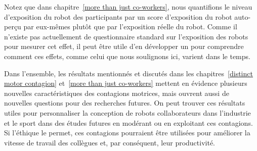 
Notez que dans chapitre~\ref{more than just co-workers}, nous quantifions le niveau d'exposition du robot des participants par un score d'exposition du robot auto-perçu par eux-mêmes plutôt que par l'exposition réelle du robot. Comme il n'existe pas actuellement de questionnaire standard sur l'exposition des robots pour mesurer cet effet, il peut être utile d'en développer un pour comprendre comment ces effets, comme celui que nous soulignons ici, varient dans le temps.



Dans l'ensemble, les résultats mentionnés et discutés dans les chapitres~\ref{distinct motor contagion} et~\ref{more than just co-workers} mettent en évidence plusieurs nouvelles caractéristiques des contagions motrices, mais ouvrent aussi de nouvelles questions pour des recherches futures. On peut trouver ces résultats utiles pour personnaliser la conception de robots collaborateurs dans l'industrie et le sport dans des études futures en modérant ou en exploitant ces contagions. Si l'éthique le permet, ces contagions pourraient être utilisées pour améliorer la vitesse de travail des collègues et, par conséquent, leur productivité.



